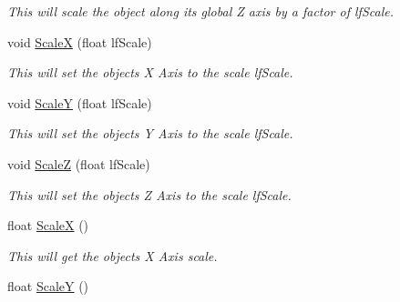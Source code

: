 \begin{DoxyCompactItemize}
\begin{DoxyCompactList}\small\item\em This will scale the object along its global Z axis by a factor of lfScale. \end{DoxyCompactList}\item 
\hypertarget{classc_matrix4_ab9bcc91e12de78a59b4d80c43c3e02ba}{
void \hyperlink{classc_matrix4_ab9bcc91e12de78a59b4d80c43c3e02ba}{ScaleX} (float lfScale)}
\label{classc_matrix4_ab9bcc91e12de78a59b4d80c43c3e02ba}

\begin{DoxyCompactList}\small\item\em This will set the objects X Axis to the scale lfScale. \end{DoxyCompactList}\item 
\hypertarget{classc_matrix4_a1f3a9e6f7112e30b1bdb8613fed6283b}{
void \hyperlink{classc_matrix4_a1f3a9e6f7112e30b1bdb8613fed6283b}{ScaleY} (float lfScale)}
\label{classc_matrix4_a1f3a9e6f7112e30b1bdb8613fed6283b}

\begin{DoxyCompactList}\small\item\em This will set the objects Y Axis to the scale lfScale. \end{DoxyCompactList}\item 
\hypertarget{classc_matrix4_afd1edcc26e0ff510c101b417f8c2dd36}{
void \hyperlink{classc_matrix4_afd1edcc26e0ff510c101b417f8c2dd36}{ScaleZ} (float lfScale)}
\label{classc_matrix4_afd1edcc26e0ff510c101b417f8c2dd36}

\begin{DoxyCompactList}\small\item\em This will set the objects Z Axis to the scale lfScale. \end{DoxyCompactList}\item 
\hypertarget{classc_matrix4_a952f122af09dcc26dae75b137874249c}{
float \hyperlink{classc_matrix4_a952f122af09dcc26dae75b137874249c}{ScaleX} ()}
\label{classc_matrix4_a952f122af09dcc26dae75b137874249c}

\begin{DoxyCompactList}\small\item\em This will get the objects X Axis scale. \end{DoxyCompactList}\item 
\hypertarget{classc_matrix4_abe36828ea2ddcee19612d4f136c49287}{
float \hyperlink{classc_matrix4_abe36828ea2ddcee19612d4f136c49287}{ScaleY} ()}
\label{classc_matrix4_abe36828ea2ddcee19612d4f136c49287}


\end{DoxyCompactItemize}
